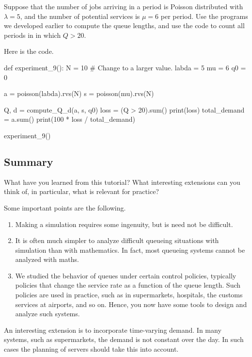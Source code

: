 \begin{exercise}
  Suppose that the number of jobs arriving in a period is Poisson distributed with $\lambda=5$, and the number of potential services is $\mu=6$ per period.
  Use the programs we developed earlier to compute the queue lengths, and use the code  to count all periods in in which $Q>20$.

  \begin{solution}
Here is the code.
\begin{pyverbatim}
def experiment_9():
    N = 10  # Change to a larger value.
    labda = 5
    mu = 6
    q0 = 0

    a = poisson(labda).rvs(N)
    s = poisson(mu).rvs(N)

    Q, d = compute_Q_d(a, s, q0)
    loss = (Q > 20).sum()
    print(loss)
    total_demand = a.sum() 
    print(100 * loss / total_demand)


experiment_9()
\end{pyverbatim}
    
  \end{solution}

\end{exercise}

\subsection{Summary}
\label{sec:summary}

\begin{exercise}
  What have you learned from this tutorial? What interesting extensions can you think of, in particular, what is relevant for practice? 
\begin{solution}
    Some important points are the following.
    \begin{enumerate}
    \item Making a simulation requires some ingenuity, but is need not be difficult.
    \item It is often much simpler to analyze difficult queueing situations with simulation than with mathematics.
      In fact, most queueing systems cannot be analyzed with maths.
    \item We studied the behavior of queues under certain control policies, typically policies that change the service rate as a function of the queue length. Such policies are used in practice, such as in supermarkets, hospitals, the customs services at airports, and so on. Hence, you now have some tools to design and analyze such systems.
    \end{enumerate}

An interesting extension is to incorporate time-varying demand. In many systems, such as supermarkets, the demand is not constant over the day. In such cases the planning of servers should take this into account.

  \end{solution}
\end{exercise}

  
